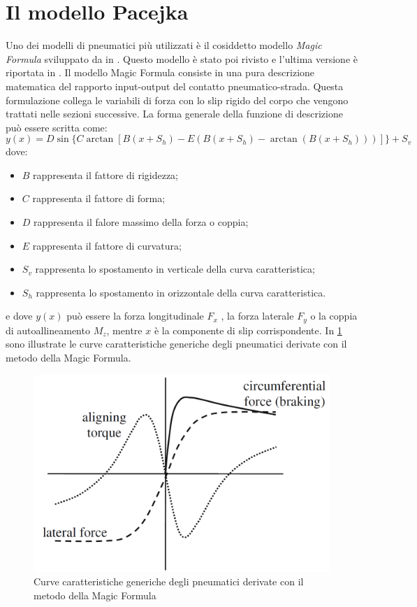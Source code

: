 \section{Il modello Pacejka}
Uno dei modelli di pneumatici più utilizzati è il cosiddetto modello \textit{Magic Formula} sviluppato da \citeauthor{bakker} in \cite{bakker}. Questo modello è stato poi rivisto e l'ultima versione è riportata in \cite{hans}. Il modello Magic Formula consiste in una pura descrizione matematica del rapporto input-output del contatto pneumatico-strada. Questa formulazione collega le variabili di forza con lo slip rigido del corpo che vengono trattati nelle sezioni successive. La forma generale della funzione di descrizione può essere scritta come:
\begin{equation}
y(x) = D\sin\{C\arctan[B(x + S_h ) - E(B(x + S_h ) - \arctan(B(x + S_h )))]\} + S_v
\end{equation}
%
dove:
\begin{itemize}
	\item $B$ rappresenta il fattore di rigidezza;
	\item $C$ rappresenta il fattore di forma;
	\item $D$ rappresenta il falore massimo della forza o coppia;
	\item $E$ rappresenta il fattore di curvatura;
	\item $S_v$ rappresenta lo spostamento in verticale della curva caratteristica;
	\item $S_h$ rappresenta lo spostamento in orizzontale della curva caratteristica.
\end{itemize}
e dove $y(x)$ può essere la forza longitudinale $F_x$ , la forza laterale $F_y$ o la coppia di autoallineamento $M_z$, mentre $x$ è la componente di slip corrispondente. In \figurename{ \ref{pacejka}} sono illustrate le curve caratteristiche generiche degli pneumatici derivate con il metodo della Magic Formula.
%
\begin{figure}[h]
	\centering
	\includegraphics[width=0.58\linewidth]{Figures/pacejka}
	\caption{Curve caratteristiche generiche degli pneumatici derivate con il metodo della Magic Formula}
	\label{pacejka}
\end{figure}
%

